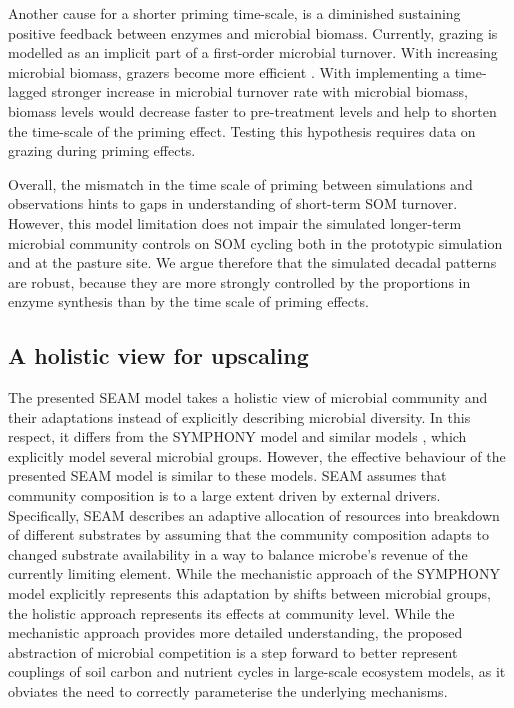 Another cause for a shorter priming time-scale, is a diminished sustaining
positive feedback between enzymes and microbial biomass. Currently, grazing is
modelled as an implicit part of a first-order microbial turnover. With
increasing microbial biomass, grazers become more efficient \citep{Clarholm81}.
With implementing a time-lagged stronger increase in microbial turnover rate
with microbial biomass, biomass levels would decrease faster to pre-treatment
levels and help to shorten the time-scale of the priming effect. Testing this
hypothesis requires data on grazing during priming effects.

Overall, the mismatch in the time scale of priming between simulations and
observations hints to gaps in understanding of short-term SOM turnover. 
However, this model limitation does not impair the
simulated longer-term microbial community controls on SOM cycling both in the
prototypic simulation and at the pasture site. We argue therefore that the
simulated decadal patterns are robust, because they are more strongly
controlled by the proportions in enzyme synthesis than by the time scale of
priming effects. 

\subsection{A holistic view for upscaling}
\label{sec:Holistic}

The presented SEAM model takes a holistic view \citep{Panikov10} of microbial
community and their adaptations instead of explicitly describing microbial
diversity.
In this respect, it differs from the SYMPHONY model \citep{Perveen14} and
similar models \citep{Fontaine03}, which explicitly model several microbial
groups.
However, the effective behaviour of the presented SEAM model is similar to these
models.
SEAM assumes that community composition is to a large extent driven by external
drivers. Specifically, SEAM describes an adaptive allocation of resources into
breakdown of different substrates by assuming that the community composition
adapts to changed substrate availability in a way to balance microbe's
revenue of the currently limiting element.
While the mechanistic approach of the SYMPHONY model explicitly represents this
adaptation by shifts between microbial groups, the holistic approach represents
its effects at community level. While the mechanistic approach provides more
detailed understanding, the proposed abstraction of microbial competition is a
step forward to better represent couplings of soil carbon and nutrient cycles in
large-scale ecosystem models, as it obviates the need to correctly parameterise
the underlying mechanisms.


